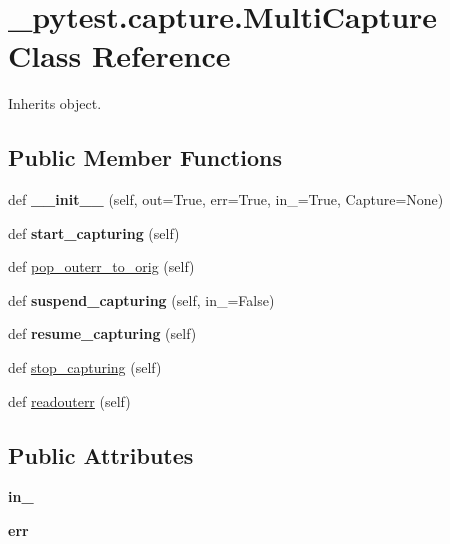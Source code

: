 \hypertarget{class__pytest_1_1capture_1_1_multi_capture}{}\section{\+\_\+pytest.\+capture.\+Multi\+Capture Class Reference}
\label{class__pytest_1_1capture_1_1_multi_capture}


Inherits object.

\subsection*{Public Member Functions}
\begin{DoxyCompactItemize}
\item 
\mbox{\label{class__pytest_1_1capture_1_1_multi_capture_a229911ac43e3868f913e303c8eca9f69}} 
def {\bfseries \+\_\+\+\_\+init\+\_\+\+\_\+} (self, out=True, err=True, in\+\_\+=True, Capture=None)
\item 
\mbox{\label{class__pytest_1_1capture_1_1_multi_capture_a71e882b6d571c4bc26b36d14730748aa}} 
def {\bfseries start\+\_\+capturing} (self)
\item 
def \hyperlink{class__pytest_1_1capture_1_1_multi_capture_aa98c9f968aec045c63c2f5dfca6c48b3}{pop\+\_\+outerr\+\_\+to\+\_\+orig} (self)
\item 
\mbox{\label{class__pytest_1_1capture_1_1_multi_capture_a06bda74c48d91f50789e7888d294e968}} 
def {\bfseries suspend\+\_\+capturing} (self, in\+\_\+=False)
\item 
\mbox{\label{class__pytest_1_1capture_1_1_multi_capture_ac9fd6b3fdc10264fdc23c6877a18b548}} 
def {\bfseries resume\+\_\+capturing} (self)
\item 
def \hyperlink{class__pytest_1_1capture_1_1_multi_capture_aac84e3d41faa2c2d9be845cabedc2aa9}{stop\+\_\+capturing} (self)
\item 
def \hyperlink{class__pytest_1_1capture_1_1_multi_capture_a3ad058f661e771453fea9cf8121ff473}{readouterr} (self)
\end{DoxyCompactItemize}
\subsection*{Public Attributes}
\begin{DoxyCompactItemize}
\item 
\mbox{\label{class__pytest_1_1capture_1_1_multi_capture_a3cdfbade82586115f014e8ef3180f6c3}} 
{\bfseries in\+\_\+}
\item 
\mbox{\label{class__pytest_1_1capture_1_1_multi_capture_a8c077e47020feea932f03f62caf2db35}} 
{\bfseries err}
\end{DoxyCompactItemize}
